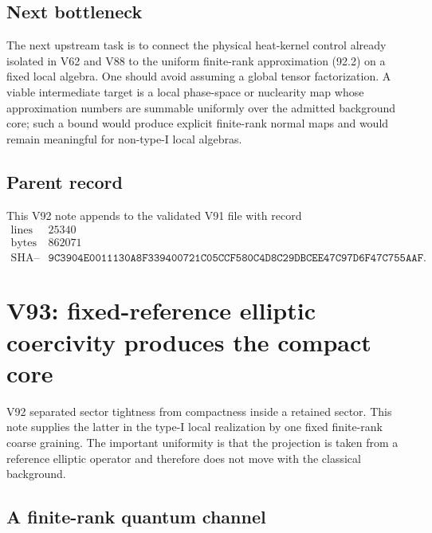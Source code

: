 \documentclass[11pt]{article}
\theoremstyle{remark}
\begin{document}
\subsection{Next bottleneck}

The next upstream task is to connect the physical heat-kernel control
already isolated in V62 and V88 to the uniform finite-rank
approximation (92.2) on a fixed local algebra.  One should avoid
assuming a global tensor factorization.  A viable intermediate
target is a local phase-space or nuclearity map whose approximation
numbers are summable uniformly over the admitted background core;
such a bound would produce explicit finite-rank normal maps and
would remain meaningful for non-type-I local algebras.

\subsection{Parent record}

This V92 note appends to the validated V91 file with record
\[
\begin{array}{c|c}
\text{lines}&25340\\
\text{bytes}&862071\\
\text{SHA--256}&
\texttt{9C3904E0011130A8F339400721C05CCF580C4D8C29DBCEE47C97D6F47C755AAF}.
\end{array}
\]



\section{V93: fixed-reference elliptic coercivity produces the
compact core}
\label{sec:v12v93}

V92 separated sector tightness from compactness inside a retained
sector.  This note supplies the latter in the type-I local
realization by one fixed finite-rank coarse graining.  The important
uniformity is that the projection is taken from a reference
elliptic operator and therefore does not move with the classical
background.

\subsection{A finite-rank quantum channel}
\end{document}
